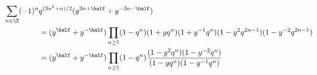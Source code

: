 \begin{equation}\label{quintuple}
  \begin{split}
    \sum_{n\in\Z} (-1)^n & q^{(3n^2+n)/2} (y^{3n+\half}+y^{-3n-\half}) \\
  &= (y^\half+y^{-\half}) \prod_{n\geq 1}(1-q^n)(1+yq^n)(1+y^{-1}q^{n})
  (1-y^2q^{2n-1})(1-y^{-2}q^{2n-1}) \\
  &=  (y^\half+y^{-\half}) \prod_{n\geq 1} (1-q^n)\frac{(1-y^2
  q^n)(1-y^{-2}q^n)}{(1-yq^n)(1-y^{-1}q^n)}
  \end{split}
\end{equation}

